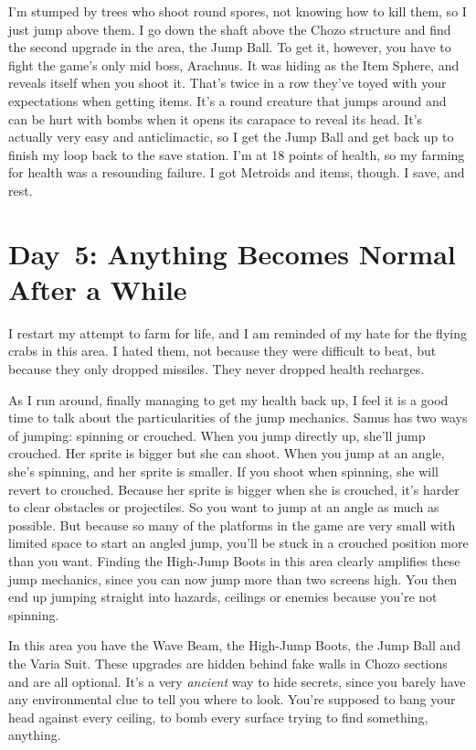 \documentclass{book}
\begin{document}
I’m stumped by trees who shoot round spores, not knowing how to kill them, so I just jump above them. I go down the shaft above the Chozo structure and find the second upgrade in the area, the Jump Ball. To get it, however, you have to fight the game’s only mid boss, Arachnus. It was hiding as the Item Sphere, and reveals itself when you shoot it. That’s twice in a row they’ve toyed with your expectations when getting items. It’s a round creature that jumps around and can be hurt with bombs when it opens its carapace to reveal its head. It’s actually very easy and anticlimactic, so I get the Jump Ball and get back up to finish my loop back to the save station. I’m at 18 points of health, so my farming for health was a resounding failure. I got Metroids and items, though. I save, and rest.\par
\FloatBarrier\section*{Day~5: Anything Becomes Normal After a While}
I restart my attempt to farm for life, and I am reminded of my hate for the flying crabs in this area. I hated them, not because they were difficult to beat, but because they only dropped missiles. They never dropped health recharges.\par
As I run around, finally managing to get my health back up, I feel it is a good time to talk about the particularities of the jump mechanics. Samus has two ways of jumping: spinning or crouched. When you jump directly up, she’ll jump crouched. Her sprite is bigger but she can shoot. When you jump at an angle, she’s spinning, and her sprite is smaller. If you shoot when spinning, she will revert to crouched. Because her sprite is bigger when she is crouched, it’s harder to clear obstacles or projectiles. So you want to jump at an angle as much as possible. But because so many of the platforms in the game are very small with limited space to start an angled jump, you’ll be stuck in a crouched position more than you want. Finding the High-Jump Boots in this area clearly amplifies these jump mechanics, since you can now jump more than two screens high. You then end up jumping straight into hazards, ceilings or enemies because you’re not spinning.\par
In this area you have the Wave Beam, the High-Jump Boots, the Jump Ball and the Varia Suit. These upgrades are hidden behind fake walls in Chozo sections and are all optional. It’s a very \emph{ancient} way to hide secrets, since you barely have any environmental clue to tell you where to look. You’re supposed to bang your head against every ceiling, to bomb every surface trying to find something, anything.\par
\end{document}
